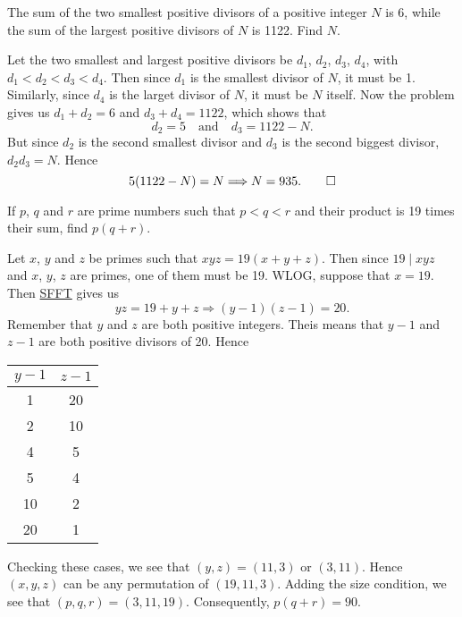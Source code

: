 \begin{question}
    The sum of the two smallest positive divisors of a positive integer $N$ is
    6, while the sum of the largest positive divisors of $N$ is 1122. Find $N$.
\end{question}
\begin{solution}
    Let the two smallest and largest positive divisors be $d_1$, $d_2$, $d_3$,
    $d_4$, with $d_1 < d_2 < d_3 < d_4$. Then since $d_1$ is the smallest
    divisor of $N$, it must be 1. Similarly, since $d_4$ is the larget divisor
    of $N$, it must be $N$ itself. Now the problem gives us $d_1 + d_2 = 6$ and
    $d_3 + d_4 = 1122$, which shows that 
    \[ d_2 = 5 \quad \text{and} \quad d_3 = 1122 - N. \]
    But since $d_2$ is the second smallest divisor and $d_3$ is the second
    biggest divisor, $d_2 d_3 = N$. Hence
    \[ 5(1122 - N) = N \Longrightarrow N = 935. \qedhere \]
\end{solution}

\begin{question}
    If $p$, $q$ and $r$ are prime numbers such that $p < q < r$ and their
    product is 19 times their sum, find $p(q + r)$.
\end{question}
\begin{solution}
    Let $x$, $y$ and $z$ be primes such that $xyz = 19(x + y + z)$. Then since
    $19 \mid xyz$ and $x$, $y$, $z$ are primes, one of them must be 19. WLOG,
    suppose that $x = 19$. Then \hyperref[teq: SFFT]{SFFT} gives us 
    \[ yz = 19 + y + z \Longrightarrow (y - 1)(z - 1) = 20. \]
    Remember that $y$ and $z$ are both positive integers. Theis means that $y -
    1$ and $z - 1$ are both positive divisors of 20. Hence
    \begin{center}
        \begin{tabular}{ |c|c| }
            \hline
            $y - 1$ & $z - 1$ \\
            \hline
            1 & 20 \\
            2 & 10 \\
            4 & 5 \\
            5 & 4 \\
            10 & 2 \\
            20 & 1 \\
            \hline
        \end{tabular}
    \end{center}
    Checking these cases, we see that $(y, z) = (11, 3)$ or $(3, 11)$. Hence
    $(x, y, z)$ can be any permutation of $(19, 11, 3)$. Adding the size
    condition, we see that $(p, q, r) = (3, 11, 19)$. Consequently, $p(q + r) =
    90$.
\end{solution}
